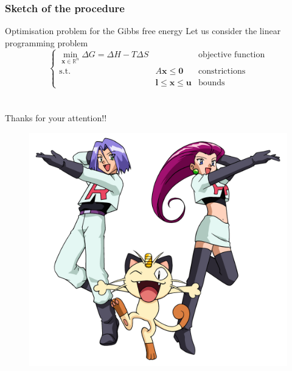 \documentclass{beamer}
\newcommand{\bm}{\boldsymbol}
\newcommand{\ds}{\displaystyle}
\newcommand{\mR}{{\mathbb R}}
\begin{document}

\begin{frame}
\frametitle{Sketch of the procedure}
\begin{block}{Optimisation problem for the Gibbs free energy}
Let us consider the linear programming problem
\begin{equation*}
\left\{
\begin{array}{lcl}
\ds\min_{\bm x\in\mR^n} \Delta G = \Delta H-T\Delta S & &\text{objective function}\\
\text{s.t.} & A\bm x \leq \bm 0 & \text{constrictions}\\
& \bm l \leqslant \bm x \leqslant \bm u & \text{bounds}
\end{array}
\right.
\end{equation*}
\end{block}
\end{frame}

\section*{}


\begin{frame}
\Huge{\centerline{Thanks for your attention!!}}
\begin{figure}
\includegraphics[width=0.5\linewidth]{team-rocket}
\end{figure}
\end{frame}

\end{document}
